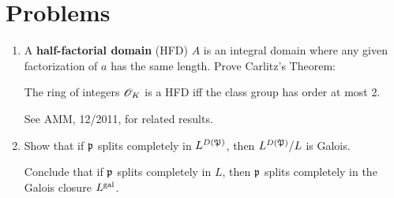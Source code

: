 \section{Problems}
\begin{enumerate}
\item 
A \textbf{half-factorial domain} (HFD) $A$ is an integral domain where any given factorization of $a$ has the same length. Prove Carlitz's Theorem:
\begin{thm}[Carlitz]
The ring of integers $\mathscr{O}_K$ is a HFD iff the class group has order at most 2.
\end{thm}
See AMM, 12/2011, for related results.
\item
Show that if $\mathfrak{p}$ splits completely in $L^{D(\mathfrak{P})}$, then $L^{D(\mathfrak{P})}/L$ is Galois.

Conclude that if $\mathfrak{p}$ splits completely in $L$, then $\mathfrak{p}$ splits completely in the Galois closure $L^{\text{gal}}$.
\end{enumerate}
